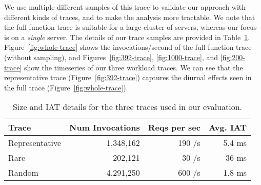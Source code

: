 
We use multiple different samples of this trace to validate our approach with different kinds of traces, and to make the analysis more tractable. We note that the full function trace is suitable for a large cluster of servers, whereas our focus is on a \emph{single} server.
The details of our trace samples are provided in Table~\ref{tab:trace-deets}. 
Figure~\ref{fig:whole-trace} shows the invocations/second of the full function trace (without sampling), and Figures~\ref{fig:392-trace}, \ref{fig:1000-trace}, and \ref{fig:200-trace} show the timeseries of our three workload traces. 
We can see that the representative trace (Figure~\ref{fig:392-trace}) captures the diurnal effects seen in the full trace (Figure~\ref{fig:whole-trace}).



\begin{table}
  \begin{tabular}{lrrr}
    \hline 
    Trace & Num Invocations & Reqs per sec & Avg. IAT \\
    \hline
    Representative & 1,348,162 & 190 /s & 5.4 ms \\
    Rare & 202,121 & 30 /s & 36 ms \\
    Random & 4,291,250 & 600 /s & 1.8 ms \\
    \hline
  \end{tabular}
  \caption{Size and IAT details for the three traces used in our evaluation.}
  \label{tab:trace-deets}
\end{table}


\begin{comment}

\begin{figure}[t]
  \texttt{[image: ../graphs/azure\_analysis/mem-dur-corr.pdf]}}
  \caption{Lack of correlation between a function's memory and average runtime duration}
  \label{fig:azure-mem-dur-corr}
\end{figure}

\begin{figure}[t]
  \texttt{[image: ../graphs/azure\_analysis/mem-conv-corr.pdf]}
  \caption{Lack of correlation between a function's memory and number of  times it is invoked}
  \label{fig:mem-invok-corr}
\end{figure}

\begin{figure}
    \texttt{[image: ../graphs/azure\_analysis/cold\_vs\_warm.pdf]}
    \caption{Relation between a functions maximum runtime and it's minimum, average, and 50th percentile average.}
    \label{fig:warm-cold-box}
\end{figure}

\end{comment}

